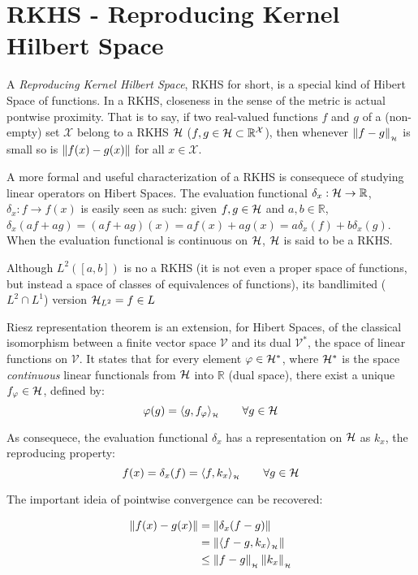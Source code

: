 \section{RKHS - Reproducing Kernel Hilbert Space}

A \textit{Reproducing Kernel Hilbert Space}, RKHS for short, is a special kind
of Hibert Space of functions. In a RKHS, closeness in the sense of the metric is
actual pontwise proximity. That is to say, if two real-valued functions $f$ and
$g$ of a (non-empty) set $\mathcal{X}$ belong to a RKHS $\mathcal{H}$ ($f,g \in \mathcal{H}
\subset \mathbb{R}^\mathcal{X}$), then whenever $\left\lVert f-g\right\rVert_{_{\mathcal{H}}}$ is small so is
$\left\lVert f(x)-g(x)\right\rVert$ for all $x \in \mathcal{X}$\cite{berlinet2011reproducing}.

A more formal and useful characterization of a RKHS is consequece of studying
linear operators on Hibert Spaces. The evaluation functional \(\delta_x: \mathcal{H} \to
\mathbb{R}\), \(\delta_x: f \to f(x)\) is easily seen as such: given \(f,g \in
\mathcal{H}\) and \(a,b \in \mathbb{R}\), \(\delta_x(af+ag)= (af+ag)(x) = af(x)+ag(x) =
a\delta_x(f)+b\delta_x(g)\). When the evaluation functional is continuous on
$\mathcal{H}$, $\mathcal{H}$ is said to be a RKHS.

Although $L^2([a,b])$ is no a RKHS (it is not even a proper space of functions,
but instead a space of classes of equivalences of functions), its bandlimited
($L^2 \cap L^1$) version $\mathcal{H}_{L^2} = {f\in L}$

Riesz representation theorem is an extension, for Hibert Spaces, of the
classical isomorphism between a finite vector space $\mathcal{V}$ and its dual
$\mathcal{V}^*$, the space of linear functions on $\mathcal{V}$. It states that
for every element $\varphi \in \mathcal{H}^*$, where $\mathcal{H}^*$ is the space
\textit{continuous} linear functionals from $\mathcal{H}$ into $\mathbb{R}$ (dual
space), there exist a unique $f_\varphi \in \mathcal{H}$, defined by:
\begin{equation*}
\varphi(g)= \langle g,f_\varphi\rangle_{_{\mathcal{H}}}\qquad \forall g \in \mathcal{H}
\end{equation*}

As consequece, the evaluation functional \(\delta_x\) has a representation on
\(\mathcal{H}\) as \(k_x\), the reproducing property:
\begin{equation*}
f(x) = \delta_x(f) = \langle f,k_x\rangle_{_{\mathcal{H}}}\qquad \forall g \in \mathcal{H}
\end{equation*}

The important ideia of pointwise convergence can be recovered:

\begin{subequations}
\begin{align}
\left\lVert f(x)-g(x)\right\rVert &= \left\lVert\delta_x(f-g)\right\rVert\\
			  &= \left\lVert\langle f-g,k_x\rangle_{_{\mathcal{H}}}\right\rVert\\
			  &\leq \left\lVert f-g\right\rVert_{_{\mathcal{H}}}\left\lVert k_x\right\rVert_{_{\mathcal{H}}}\label{eq:cs_ineq}
\end{align}
\end{subequations}

